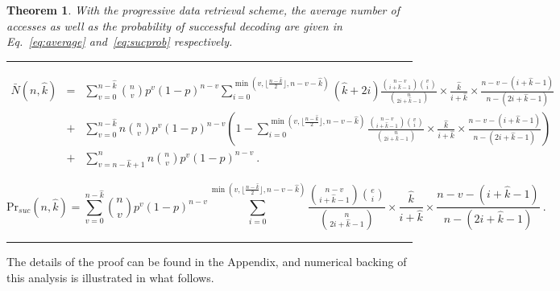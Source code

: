 \documentclass[10pt,journal,letterpaper,compsoc]{IEEEtran}
\newtheorem{theorem}{Theorem}
\newcommand{\0}{{\bf 0}}
\begin{document}
\begin{theorem}
With the progressive data retrieval scheme, the average number of accesses as well as the 
probability of successful decoding are given in Eq.~\eqref{eq:average} and~\eqref{eq:sucprob} respectively.
\begin{table*}
\par\noindent\rule{0.9\textwidth}{0.4pt}\begin{eqnarray}
\nonumber
\bar N(n,\hat{k})&=&\sum_{v=0}^{n-\hat{k}}{n\choose v}p^v(1-p)^{n-v}\sum_{i=0}^{\min(v, \lfloor{\frac{n-\hat{k}}{2}}\rfloor, n-v-\hat{k})}(\hat{k}+2i)\frac{{n-v\choose i+\hat{k}-1}{v \choose i}}{{n \choose 2i+\hat{k}-1}}\times \frac{\hat{k}}{i+\hat{k}} \times \frac{n - v - (i+\hat{k}-1)}{n - (2i+\hat{k}
-1)} \\
\nonumber
&+& \sum_{v=0}^{n-\hat{k}}n{n\choose v}p^v(1-p)^{n-v}\left(1-\sum_{i=0}^{\min(v, \lfloor{\frac{n-\hat{k}}{2}}\rfloor, n-v-\hat{k})}\frac{{n-v\choose i+\hat{k}-1}{v \choose i}}{{n \choose 2i+\hat{k}-1}}\times \frac{\hat{k}}{i+\hat{k}} \times \frac{n - v - (i+\hat{k}-1)}{n - (2i+\hat{k}
-1)}\right) \\
&+ &\sum_{v=n-\hat{k}+1}^{n}n{n\choose v}p^v(1-p)^{n-v}~.
\label{eq:average}
\end{eqnarray}

\begin{equation}
\mbox{Pr}_{suc}(n,\hat{k})=\sum_{v=0}^{n-\hat{k}}{n\choose v}p^v(1-p)^{n-v}\sum_{i=0}^{\min(v, \lfloor{\frac{n-\hat{k}}{2}}\rfloor, n-v-\hat{k})}\frac{{n-v\choose i+\hat{k}-1}{e \choose i}}{{n \choose 2i+\hat{k}-1}}\times \frac{\hat{k}}{i+\hat{k}} \times \frac{n - v - (i+\hat{k}-1)}{n - (2i+\hat{k}
-1)}~.
\label{eq:sucprob}
\end{equation}
\par\noindent\rule{0.9\textwidth}{0.4pt}\end{table*}
\label{thm:average_access}
\end{theorem}
The details of the proof can be found in the Appendix, and numerical 
backing of this analysis is illustrated in what follows.
\end{document}

